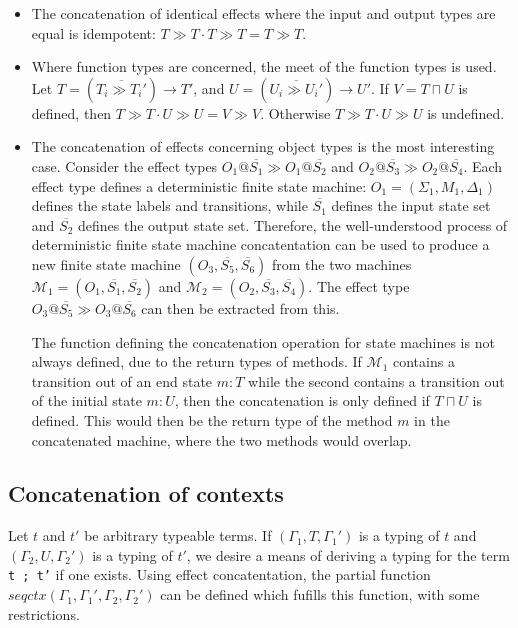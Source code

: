 \documentclass[preprint]{sigplanconf}
\makeatletter
\newcommand{\ot}[2]{#1@\overline{#2}}
\newcommand{\funt}[3]{(\overline{#1 \gg #2}) \rightarrow #3}
\makeatother
\begin{document}
\begin{itemize}
\item The concatenation of identical effects where the input and
output types are equal is idempotent: $T \gg T \cdot T \gg T = T \gg T$.
\item Where function types are concerned, the meet of the function types
is used. Let $T = \funt{T_i}{T_i'}{T'}$, and
$U = \funt{U_i}{U_i'}{U'}$. If $V = T \sqcap U$ is defined, then
$T \gg T \cdot U \gg U = V \gg V$. Otherwise
$T \gg T \cdot U \gg U$ is undefined.
\item The concatenation of effects concerning object types is the most
interesting case.
Consider the effect types $\ot{O_1}{S_1} \gg \ot{O_1}{S_2}$ and
$\ot{O_2}{S_3} \gg \ot{O_2}{S_4}$. Each effect type defines a
deterministic finite state machine: $O_1 = (\Sigma_1, M_1, \Delta_1)$
defines the state labels and transitions, while $\overline{S_1}$ 
defines the input state set and $\overline{S_2}$ defines the output
state set. Therefore, the well-understood process of
deterministic finite state machine concatentation can be used to produce
a new finite state machine $(O_3, \overline{S_5}, \overline{S_6})$ from
the two machines $\mathcal{M}_1 = (O_1, \overline{S_1}, \overline{S_2})$ and
$\mathcal{M}_2 = (O_2, \overline{S_3}, \overline{S_4})$. The effect type
$\ot{O_3}{S_5} \gg \ot{O_3}{S_6}$ can then be extracted from this.

The function defining the concatenation operation for state machines is
not always defined, due to the return types of methods.
If $\mathcal{M}_1$ contains a transition out of an end state $m : T$
while the second contains a transition out of the initial state 
$m : U$, then the concatenation is only defined if $T \sqcap U$ is defined.
This would then be the return type of the method $m$ in the concatenated
machine, where the two methods would overlap.
\end{itemize}

\subsection{Concatenation of contexts}

Let $t$ and $t'$ be arbitrary typeable terms. If $(\Gamma_1, T, \Gamma_1')$
is a typing of $t$ and $(\Gamma_2, U, \Gamma_2')$ is a typing of $t'$, we
desire a means of deriving a typing for the term {\tt t ; t'} if one exists.
Using effect concatentation, the partial function
$\mathit{seqctx}(\Gamma_1, \Gamma_1', \Gamma_2, \Gamma_2')$ can be defined
which fufills this function, with some restrictions.
\end{document}
